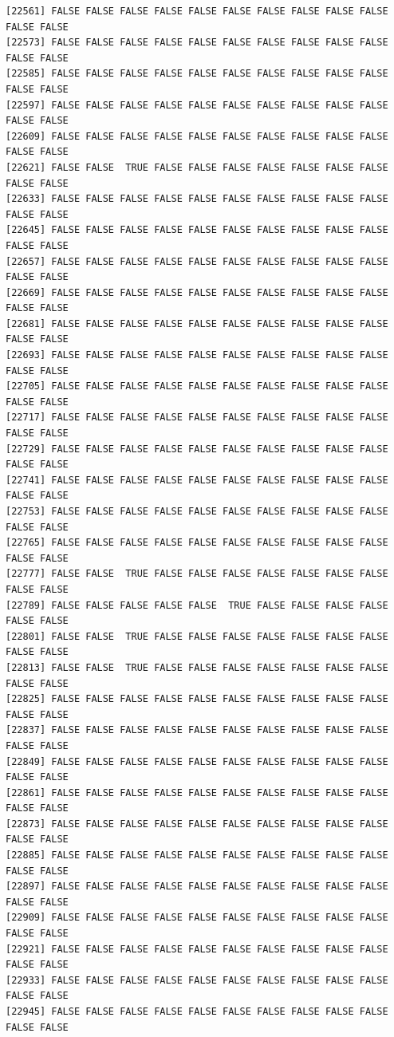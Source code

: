 \documentclass[
  a4paper,
  DIV=11,
  numbers=noendperiod]{scrartcl}
\begin{document}
\begin{verbatim}
[22561] FALSE FALSE FALSE FALSE FALSE FALSE FALSE FALSE FALSE FALSE FALSE FALSE
[22573] FALSE FALSE FALSE FALSE FALSE FALSE FALSE FALSE FALSE FALSE FALSE FALSE
[22585] FALSE FALSE FALSE FALSE FALSE FALSE FALSE FALSE FALSE FALSE FALSE FALSE
[22597] FALSE FALSE FALSE FALSE FALSE FALSE FALSE FALSE FALSE FALSE FALSE FALSE
[22609] FALSE FALSE FALSE FALSE FALSE FALSE FALSE FALSE FALSE FALSE FALSE FALSE
[22621] FALSE FALSE  TRUE FALSE FALSE FALSE FALSE FALSE FALSE FALSE FALSE FALSE
[22633] FALSE FALSE FALSE FALSE FALSE FALSE FALSE FALSE FALSE FALSE FALSE FALSE
[22645] FALSE FALSE FALSE FALSE FALSE FALSE FALSE FALSE FALSE FALSE FALSE FALSE
[22657] FALSE FALSE FALSE FALSE FALSE FALSE FALSE FALSE FALSE FALSE FALSE FALSE
[22669] FALSE FALSE FALSE FALSE FALSE FALSE FALSE FALSE FALSE FALSE FALSE FALSE
[22681] FALSE FALSE FALSE FALSE FALSE FALSE FALSE FALSE FALSE FALSE FALSE FALSE
[22693] FALSE FALSE FALSE FALSE FALSE FALSE FALSE FALSE FALSE FALSE FALSE FALSE
[22705] FALSE FALSE FALSE FALSE FALSE FALSE FALSE FALSE FALSE FALSE FALSE FALSE
[22717] FALSE FALSE FALSE FALSE FALSE FALSE FALSE FALSE FALSE FALSE FALSE FALSE
[22729] FALSE FALSE FALSE FALSE FALSE FALSE FALSE FALSE FALSE FALSE FALSE FALSE
[22741] FALSE FALSE FALSE FALSE FALSE FALSE FALSE FALSE FALSE FALSE FALSE FALSE
[22753] FALSE FALSE FALSE FALSE FALSE FALSE FALSE FALSE FALSE FALSE FALSE FALSE
[22765] FALSE FALSE FALSE FALSE FALSE FALSE FALSE FALSE FALSE FALSE FALSE FALSE
[22777] FALSE FALSE  TRUE FALSE FALSE FALSE FALSE FALSE FALSE FALSE FALSE FALSE
[22789] FALSE FALSE FALSE FALSE FALSE  TRUE FALSE FALSE FALSE FALSE FALSE FALSE
[22801] FALSE FALSE  TRUE FALSE FALSE FALSE FALSE FALSE FALSE FALSE FALSE FALSE
[22813] FALSE FALSE  TRUE FALSE FALSE FALSE FALSE FALSE FALSE FALSE FALSE FALSE
[22825] FALSE FALSE FALSE FALSE FALSE FALSE FALSE FALSE FALSE FALSE FALSE FALSE
[22837] FALSE FALSE FALSE FALSE FALSE FALSE FALSE FALSE FALSE FALSE FALSE FALSE
[22849] FALSE FALSE FALSE FALSE FALSE FALSE FALSE FALSE FALSE FALSE FALSE FALSE
[22861] FALSE FALSE FALSE FALSE FALSE FALSE FALSE FALSE FALSE FALSE FALSE FALSE
[22873] FALSE FALSE FALSE FALSE FALSE FALSE FALSE FALSE FALSE FALSE FALSE FALSE
[22885] FALSE FALSE FALSE FALSE FALSE FALSE FALSE FALSE FALSE FALSE FALSE FALSE
[22897] FALSE FALSE FALSE FALSE FALSE FALSE FALSE FALSE FALSE FALSE FALSE FALSE
[22909] FALSE FALSE FALSE FALSE FALSE FALSE FALSE FALSE FALSE FALSE FALSE FALSE
[22921] FALSE FALSE FALSE FALSE FALSE FALSE FALSE FALSE FALSE FALSE FALSE FALSE
[22933] FALSE FALSE FALSE FALSE FALSE FALSE FALSE FALSE FALSE FALSE FALSE FALSE
[22945] FALSE FALSE FALSE FALSE FALSE FALSE FALSE FALSE FALSE FALSE FALSE FALSE

\end{verbatim}
\end{document}
